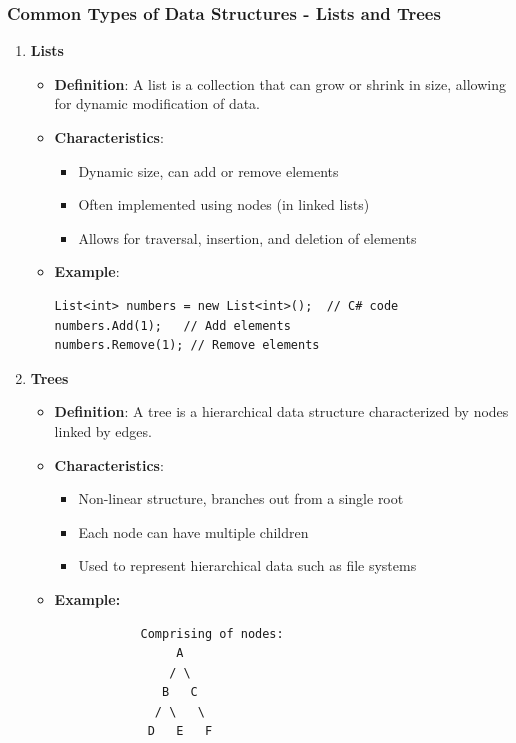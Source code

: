 \documentclass{beamer}
\begin{document}
\begin{frame}[fragile]
    \frametitle{Common Types of Data Structures - Lists and Trees}
    \begin{enumerate}
        \item \textbf{Lists}
        \begin{itemize}
            \item \textbf{Definition}: A list is a collection that can grow or shrink in size, allowing for dynamic modification of data. 
            \item \textbf{Characteristics}: 
            \begin{itemize}
                \item Dynamic size, can add or remove elements
                \item Often implemented using nodes (in linked lists)
                \item Allows for traversal, insertion, and deletion of elements
            \end{itemize}
            \item \textbf{Example}: 
            \begin{lstlisting}
List<int> numbers = new List<int>();  // C# code
numbers.Add(1);   // Add elements
numbers.Remove(1); // Remove elements
            \end{lstlisting}
        \end{itemize}

        \item \textbf{Trees}
        \begin{itemize}
            \item \textbf{Definition}: A tree is a hierarchical data structure characterized by nodes linked by edges.
            \item \textbf{Characteristics}: 
            \begin{itemize}
                \item Non-linear structure, branches out from a single root
                \item Each node can have multiple children
                \item Used to represent hierarchical data such as file systems
            \end{itemize}
            \item \textbf{Example:}
            \begin{verbatim}
            Comprising of nodes:
                 A               
                / \
               B   C         
              / \   \
             D   E   F
            \end{verbatim}
        \end{itemize}
    \end{enumerate}
\end{frame}
\end{document}
